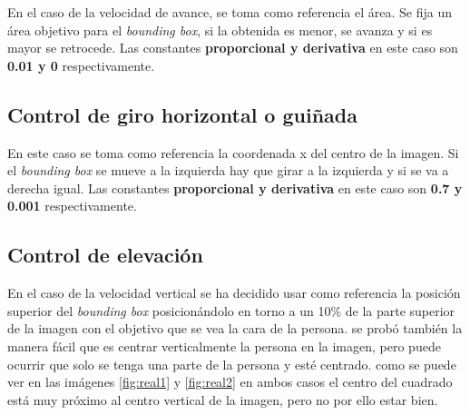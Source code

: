 En el caso de la velocidad de avance, se toma como referencia el área. Se fija un área objetivo para el \textit{bounding box}, si la obtenida es menor, se avanza y si es mayor se retrocede. Las constantes \textbf{proporcional y derivativa} en este caso son \textbf{0.01 y 0} respectivamente.

\subsection*{Control de giro horizontal o guiñada}

En este caso se toma como referencia la coordenada x del centro de la imagen. Si el \textit{bounding box} se mueve a la izquierda hay que girar a la izquierda y si se va a derecha igual. Las constantes \textbf{proporcional y derivativa} en este caso son \textbf{0.7 y 0.001} respectivamente.

\subsection*{Control de elevación}
En el caso de la velocidad vertical se ha decidido usar como referencia la posición superior del \textit{bounding box} posicionándolo en torno a un 10\% de la parte superior de la imagen con el objetivo que se vea la cara de la persona. se probó también la manera fácil que es centrar verticalmente la persona en la imagen, pero puede ocurrir que solo se tenga una parte de la persona y esté centrado. como se puede ver en las imágenes \ref{fig:real1} y \ref{fig:real2} en ambos casos el centro del cuadrado está muy próximo al centro vertical de la imagen, pero no por ello estar bien.

